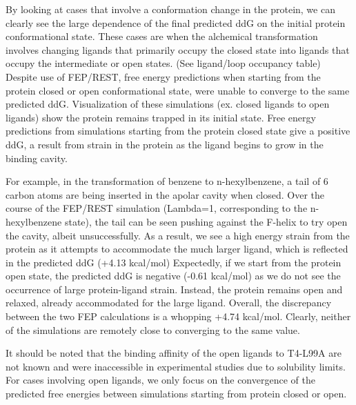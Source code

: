 \documentclass{article}
\begin{document}
By looking at cases that involve a conformation change in the protein, we can clearly see the large dependence of the final predicted ddG on the initial protein conformational state.
These cases are when the alchemical transformation involves changing ligands that primarily occupy the closed state into ligands that occupy the intermediate or open states. (See ligand/loop occupancy table)
Despite use of FEP/REST, free energy predictions when starting from the protein closed or open conformational state, were unable to converge to the same predicted ddG.
Visualization of these simulations (ex. closed ligands to open ligands) show the protein remains trapped in its initial state.
Free energy predictions from simulations starting from the protein closed state give a positive ddG, a result from strain in the protein as the ligand begins to grow in the binding cavity.

For example, in the transformation of benzene to n-hexylbenzene, a tail of 6 carbon atoms are being inserted in the apolar cavity when closed.
Over the course of the FEP/REST simulation (Lambda=1, corresponding to the n-hexylbenzene state), the tail can be seen pushing against the F-helix to try open the cavity, albeit unsuccessfully.
As a result, we see a high energy strain from the protein as it attempts to accommodate the much larger ligand, which is reflected in the predicted ddG (+4.13 kcal/mol)
Expectedly, if we start from the protein open state, the predicted ddG is negative (-0.61 kcal/mol) as we do not see the occurrence of large protein-ligand strain.
Instead, the protein remains open and relaxed, already accommodated for the large ligand.
Overall, the discrepancy between the two FEP calculations is a whopping +4.74 kcal/mol.
Clearly, neither of the simulations are remotely close to converging to the same value. 

It should be noted that the binding affinity of the open ligands to T4-L99A are not known and were inaccessible in experimental studies due to solubility limits. \cite{Merski2015}
For cases involving open ligands, we only focus on the convergence of the predicted free energies between simulations starting from protein closed or open.
\end{document}
